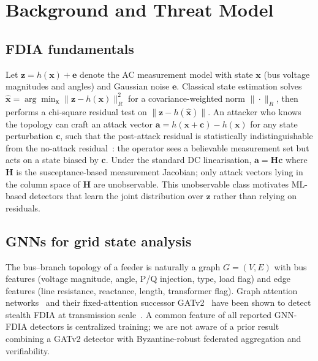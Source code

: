 \documentclass[conference]{IEEEtran}
\begin{document}
\section{Background and Threat Model}
\label{sec:bg}
\subsection{FDIA fundamentals}
Let $\mathbf{z} = h(\mathbf{x}) + \mathbf{e}$ denote the AC measurement model with state $\mathbf{x}$ (bus voltage magnitudes and angles) and Gaussian noise $\mathbf{e}$. Classical state estimation solves $\hat{\mathbf{x}}=\arg\min_{\mathbf{x}}\|\mathbf{z}-h(\mathbf{x})\|_R^2$ for a covariance-weighted norm $\|\cdot\|_R$, then performs a chi-square residual test on $\|\mathbf{z}-h(\hat{\mathbf{x}})\|$. An attacker who knows the topology can craft an attack vector $\mathbf{a} = h(\mathbf{x} + \mathbf{c}) - h(\mathbf{x})$ for any state perturbation $\mathbf{c}$, such that the post-attack residual is statistically indistinguishable from the no-attack residual~\cite{liu2011false}: the operator sees a believable measurement set but acts on a state biased by $\mathbf{c}$. Under the standard DC linearisation, $\mathbf{a} = \mathbf{H}\mathbf{c}$ where $\mathbf{H}$ is the susceptance-based measurement Jacobian; only attack vectors lying in the column space of $\mathbf{H}$ are unobservable. This unobservable class motivates ML-based detectors that learn the joint distribution over $\mathbf{z}$ rather than relying on residuals.

\subsection{GNNs for grid state analysis}
The bus--branch topology of a feeder is naturally a graph $G=(V,E)$ with bus features (voltage magnitude, angle, P/Q injection, type, load flag) and edge features (line resistance, reactance, length, transformer flag). Graph attention networks~\cite{velickovic2018gat} and their fixed-attention successor GATv2~\cite{brody2022gatv2} have been shown to detect stealth FDIA at transmission scale~\cite{boyaci2022gnn,boyaci2022joint,takiddin2023generalized,haghshenas2023temporal,chen2023edgegcn}. A common feature of all reported GNN-FDIA detectors is centralized training; we are not aware of a prior result combining a GATv2 detector with Byzantine-robust federated aggregation and verifiability.
\end{document}
